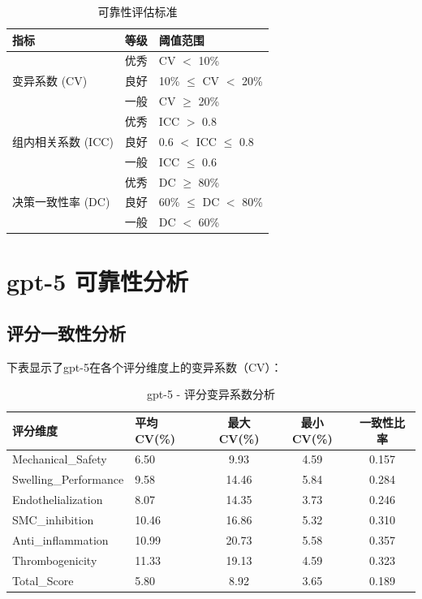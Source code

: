 \documentclass[12pt,a4paper]{article}
\begin{document}
\begin{table}[H]
\centering
\caption{可靠性评估标准}
\begin{tabular}{lll}
\toprule
\textbf{指标} & \textbf{等级} & \textbf{阈值范围} \\
\midrule
\multirow{3}{*}{变异系数 (CV)} & 优秀 & CV $<$ 10\% \\
& 良好 & 10\% $\le$ CV $<$ 20\% \\
& 一般 & CV $\ge$ 20\% \\
\midrule
\multirow{3}{*}{组内相关系数 (ICC)} & 优秀 & ICC $>$ 0.8 \\
& 良好 & 0.6 $<$ ICC $\le$ 0.8 \\
& 一般 & ICC $\le$ 0.6 \\
\midrule
\multirow{3}{*}{决策一致性率 (DC)} & 优秀 & DC $\ge$ 80\% \\
& 良好 & 60\% $\le$ DC $<$ 80\% \\
& 一般 & DC $<$ 60\% \\
\bottomrule
\end{tabular}
\end{table}

\newpage


\section{gpt-5 可靠性分析}

\subsection{评分一致性分析}

下表显示了gpt-5在各个评分维度上的变异系数（CV）：

\begin{table}[H]
\centering
\caption{gpt-5 - 评分变异系数分析}
\begin{tabular}{llccc}
\toprule
\textbf{评分维度} & \textbf{平均CV(\%)} & \textbf{最大CV(\%)} & \textbf{最小CV(\%)} & \textbf{一致性比率} \\
\midrule
Mechanical\_Safety & 6.50 & 9.93 & 4.59 & 0.157 \\
Swelling\_Performance & 9.58 & 14.46 & 5.84 & 0.284 \\
Endothelialization & 8.07 & 14.35 & 3.73 & 0.246 \\
SMC\_inhibition & 10.46 & 16.86 & 5.32 & 0.310 \\
Anti\_inflammation & 10.99 & 20.73 & 5.58 & 0.357 \\
Thrombogenicity & 11.33 & 19.13 & 4.59 & 0.323 \\
Total\_Score & 5.80 & 8.92 & 3.65 & 0.189 \\
\bottomrule
\end{tabular}
\end{table}
\end{document}
